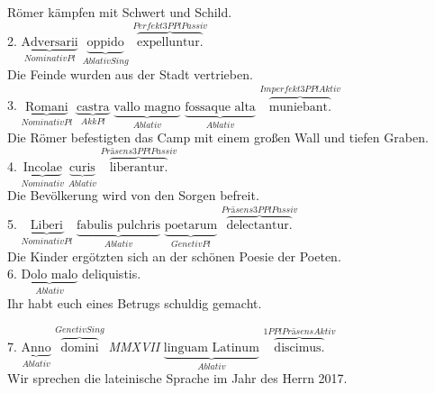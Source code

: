 \documentclass[a4paper]{article}
\newcommand{\ann}[2]{$\underbrace{\text{#1}}_{#2}$}
\newcommand{\ovv}[2]{$\overbrace{\text{#1}}^{#2}$}
\begin{document}
Römer kämpfen mit Schwert und Schild. \\

2. \ann{Adversarii}{Nominativ Pl} \ann{oppido}{Ablativ Sing} \ovv{expelluntur.}{Perfekt 3P Pl Passiv} \\

Die Feinde wurden aus der Stadt vertrieben. \\

3. \ann{Romani}{Nominativ Pl} \ann{castra}{Akk Pl} \ann{vallo magno}{Ablativ} \ann{fossaque alta}{Ablativ} \ovv{muniebant.}{Imperfekt 3P Pl Aktiv} \\

Die Römer befestigten das Camp mit einem großen Wall und tiefen Graben. \\

4. \ann{Incolae}{Nominativ} \ann{curis}{Ablativ} \ovv{liberantur.}{Präsens 3P Pl Passiv} \\

Die Bevölkerung wird von den Sorgen befreit. \\

5. \ann{Liberi}{Nominativ Pl} \ann{fabulis pulchris}{Ablativ} \ann{poetarum}{Genetiv Pl} \ovv{delectantur.}{Präsens 3P Pl Passiv} \\

Die Kinder ergötzten sich an der schönen Poesie der Poeten. \\

6. \ann{Dolo malo}{Ablativ} deliquistis. \\

Ihr habt euch eines Betrugs schuldig gemacht.

7. \ann{Anno}{Ablativ} \ovv{domini}{Genetiv Sing} \textit{MMXVII} \ann{linguam Latinum}{Ablativ} \ovv{discimus.}{1P Pl Präsens Aktiv} \\

Wir sprechen die lateinische Sprache im Jahr des Herrn 2017.
\end{document}
